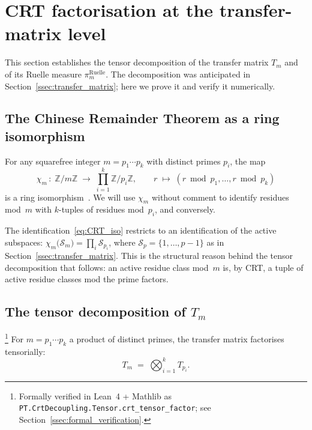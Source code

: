 \section{CRT factorisation at the transfer-matrix level}
\label{sec:crt_factor}

This section establishes the tensor decomposition of the transfer
matrix $T_m$ and of its Ruelle measure
$\pi_m^{\mathrm{Ruelle}}$. The decomposition was anticipated in
Section~\ref{ssec:transfer_matrix}; here we prove it and verify it
numerically.

\subsection{The Chinese Remainder Theorem as a ring isomorphism}
\label{ssec:crt_ring}

For any squarefree integer $m = p_1 \cdots p_k$ with distinct
primes $p_i$, the map
\begin{equation}
  \chi_m \,:\;
  \mathbb{Z}/m\mathbb{Z}
  \;\longrightarrow\;
  \prod_{i=1}^{k} \mathbb{Z}/p_i\mathbb{Z},
  \qquad
  r \;\longmapsto\; (r \bmod p_1, \ldots, r \bmod p_k)
  \label{eq:CRT_iso}
\end{equation}
is a ring isomorphism~\cite[Thm.~2.18]{Davenport2000}. We will use
$\chi_m$ without comment to identify residues mod~$m$ with $k$-tuples
of residues mod~$p_i$, and conversely.

The identification~\eqref{eq:CRT_iso} restricts to an identification
of the active subspaces:
$\chi_m\bigl(\mathcal{S}_m\bigr) = \prod_i \mathcal{S}_{p_i}$, where
$\mathcal{S}_p = \{1, \ldots, p-1\}$ as in
Section~\ref{ssec:transfer_matrix}. This is the structural reason
behind the tensor decomposition that follows: an active residue
class mod~$m$ is, by CRT, a tuple of active residue classes mod the
prime factors.

\subsection{The tensor decomposition of $T_m$}
\label{ssec:Tm_decomposition}

\begin{theorem}
\label{thm:crt_tensor}
\footnote{Formally verified in Lean~4 + Mathlib as
\texttt{PT.CrtDecoupling.Tensor.crt\_tensor\_factor};
see Section~\ref{ssec:formal_verification}.}
For $m = p_1 \cdots p_k$ a product of distinct primes, the
transfer matrix factorises tensorially:
\begin{equation}
  T_m \;=\; \bigotimes_{i=1}^{k} T_{p_i}.
  \label{eq:Tm_tensor}
\end{equation}
\end{theorem}

